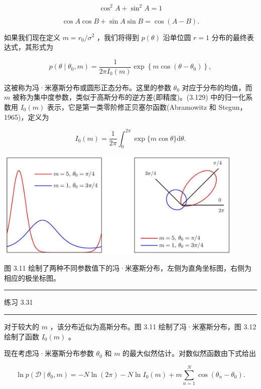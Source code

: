 \documentclass[10pt]{report}
\newcommand{\HRule}{\begin{center}\rule{0.9\linewidth}{0.2mm}\end{center}}
\begin{document}
\[
{\cos }^{2}A + {\sin }^{2}A = 1 \tag{3.127}
\]

\[
\cos A\cos B + \sin A\sin B = \cos \left( {A - B}\right) . \tag{3.128}
\]

如果我们现在定义 \(m = {r}_{0}/{\sigma }^{2}\) ，我们将得到 \(p\left( \theta \right)\) 沿单位圆 \(r = 1\) 分布的最终表达式，其形式为

\[
p\left( {\theta  \mid  {\theta }_{0},m}\right)  = \frac{1}{{2\pi }{I}_{0}\left( m\right) }\exp \left\{  {m\cos \left( {\theta  - {\theta }_{0}}\right) }\right\}  , \tag{3.129}
\]

这被称为冯·米塞斯分布或圆形正态分布。这里的参数 \({\theta }_{0}\) 对应于分布的均值，而 \(m\) 被称为集中度参数，类似于高斯分布的逆方差(即精度)。(3.129) 中的归一化系数用 \({I}_{0}\left( m\right)\) 表示，它是第一类零阶修正贝塞尔函数(Abramowitz 和 Stegun，1965)，定义为

\[
{I}_{0}\left( m\right)  = \frac{1}{2\pi }{\int }_{0}^{2\pi }\exp \{ m\cos \theta \} \mathrm{d}\theta . \tag{3.130}
\]

\begin{center}
\includegraphics[max width=0.9\textwidth]{images/0194e279-9b28-703a-88f4-c3ac21e2010d_111_276_356_1193_517_0.jpg}
\end{center}
\hspace*{3em} 

图 3.11 绘制了两种不同参数值下的冯·米塞斯分布，左侧为直角坐标图，右侧为相应的极坐标图。

\HRule

练习 3.31

\HRule

对于较大的 \(m\) ，该分布近似为高斯分布。图 3.11 绘制了冯·米塞斯分布，图 3.12 绘制了函数 \({I}_{0}\left( m\right)\) 。

现在考虑冯·米塞斯分布参数 \({\theta }_{0}\) 和 \(m\) 的最大似然估计。对数似然函数由下式给出

\[
\ln p\left( {\mathcal{D} \mid  {\theta }_{0},m}\right)  =  - N\ln \left( {2\pi }\right)  - N\ln {I}_{0}\left( m\right)  + m\mathop{\sum }\limits_{{n = 1}}^{N}\cos \left( {{\theta }_{n} - {\theta }_{0}}\right) . \tag{3.131}
\]
\end{document}
